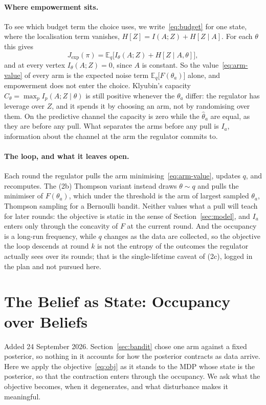 \documentclass[11pt]{article}
\theoremstyle{remark}
\newcommand{\E}{\mathbb E}
\newcommand{\1}{\mathds{1}}
\newcommand{\Hf}[1]{H\!\left[#1\right]}
\begin{document}
\paragraph{Where empowerment sits.}
To see which budget term the choice uses, we write~\eqref{eq:budget} for one state, where the localisation term vanishes, $\Hf{Z}=I(A;Z)+\Hf{Z\mid A}$.
For each $\theta$ this gives
\begin{equation}
  J_{\mathrm{exp}}(\pi)=\E_q\Big[I_\theta(A;Z)+\Hf{Z\mid A,\theta}\Big],
\end{equation}
and at every vertex $I_\theta(A;Z)=0$, since $A$ is constant.
So the value~\eqref{eq:arm-value} of every arm is the expected noise term $\E_q\big[F(\theta_a)\big]$ alone, and empowerment does not enter the choice.
Klyubin's capacity $C_\theta=\max_pI_p(A;Z\mid\theta)$ is still positive whenever the $\theta_a$ differ: the regulator has leverage over $Z$, and it spends it by choosing an arm, not by randomising over them.
On the predictive channel the capacity is zero while the $\hat\theta_a$ are equal, as they are before any pull.
What separates the arms before any pull is $I_a$, information about the channel at the arm the regulator commits to.

\paragraph{The loop, and what it leaves open.}
Each round the regulator pulls the arm minimising~\eqref{eq:arm-value}, updates $q$, and recomputes.
The (2b) Thompson variant instead draws $\theta\sim q$ and pulls the minimiser of $F(\theta_a)$, which under the threshold is the arm of largest sampled $\theta_a$, Thompson sampling for a Bernoulli bandit.
Neither values what a pull will teach for later rounds: the objective is static in the sense of Section~\ref{sec:model}, and $I_a$ enters only through the concavity of $F$ at the current round.
And the occupancy is a long-run frequency, while $q$ changes as the data are collected, so the objective the loop descends at round $k$ is not the entropy of the outcomes the regulator actually sees over its rounds; that is the single-lifetime caveat of (2c), logged in the plan and not pursued here.

\section{The Belief as State: Occupancy over Beliefs}
\label{sec:belief}
Added 24 September 2026.
Section~\ref{sec:bandit} chose one arm against a fixed posterior, so nothing in it accounts for how the posterior contracts as data arrive.
Here we apply the objective~\eqref{eq:obj} as it stands to the MDP whose state is the posterior, so that the contraction enters through the occupancy.
We ask what the objective becomes, when it degenerates, and what disturbance makes it meaningful.
\end{document}
